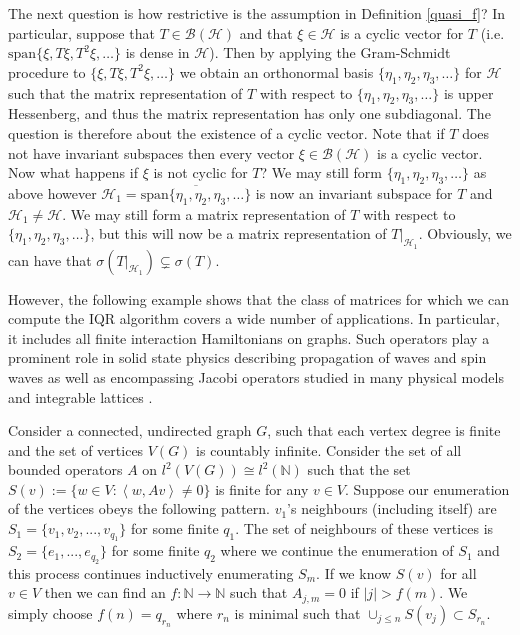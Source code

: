 \documentclass[a4paper,10pt]{article}
\begin{document}
The next question is how restrictive is the assumption in Definition \ref{quasi_f}? In particular, suppose that $T \in \mathcal{B}(\mathcal{H})$ and that $\xi \in \mathcal{H}$ is a cyclic vector for $T$ (i.e. $\mathrm{span}\{\xi, T\xi, T^2\xi, \hdots\}$ is dense in $\mathcal{H}$). Then by applying the Gram-Schmidt procedure to $\{\xi, T\xi, T^2\xi, \hdots\}$ we 
obtain an orthonormal basis $\{\eta_1, \eta_2, \eta_3, \hdots\}$ for $\mathcal{H}$ such that the matrix 
representation of $T$ with respect to $\{\eta_1, \eta_2, \eta_3, \hdots\}$ is upper Hessenberg, and thus the matrix representation has only one subdiagonal. The question is therefore about the existence of a cyclic vector. Note that if $T$ does not have invariant subspaces then every vector $\xi \in \mathcal{B}(\mathcal{H})$ is a cyclic vector. Now what happens if $\xi$ is not cyclic for $T$? We may still form $\{\eta_1, \eta_2, \eta_3, \hdots\}$ as above however $\mathcal{H}_1 = \overline{\mathrm{span}\{\eta_1, \eta_2, \eta_3, \hdots\}}$ is now an invariant subspace for $T$ and $\mathcal{H}_1 \neq \mathcal{H}.$ We may still form a matrix representation of $T$ with respect to $\{\eta_1, \eta_2, \eta_3, \hdots\}$, but this will now be a matrix representation of $T|_{\mathcal{H}_1}.$ Obviously, we can have that $\sigma(T|_{\mathcal{H}_1}) \subsetneq \sigma(T)$.

However, the following example shows that the class of matrices for which we can compute the IQR algorithm covers a wide number of applications. In particular, it includes all finite interaction Hamiltonians on graphs. Such operators play a prominent role in solid state physics \cite{mattis1986few,mogilner1991hamiltonians} describing propagation of waves and spin waves as well as encompassing Jacobi operators studied in many physical models and integrable lattices \cite{teschl2000jacobi}.

\begin{example}
Consider a connected, undirected graph $G$, such that each vertex degree is finite and the set of vertices $V(G)$ is countably infinite. Consider the set of all bounded operators $A$ on $l^2(V(G))\cong l^2(\mathbb{N})$ such that the set $S(v):=\{w\in V:\left\langle w,Av\right\rangle\neq0\}$ is finite for any $v\in V$. Suppose our enumeration of the vertices obeys the following pattern. $v_1$'s neighbours (including itself) are $S_1=\{v_1,v_2,...,v_{q_1}\}$ for some finite $q_1$. The set of neighbours of these vertices is $S_2=\{e_1,...,e_{q_2}\}$ for some finite $q_2$ where we continue the enumeration of $S_1$ and this process continues inductively enumerating $S_m$. If we know $S(v)$ for all $v\in V$ then we can find an $f:\mathbb{N}\rightarrow\mathbb{N}$ such that $A_{j,m}=0$ if $|j|>f(m)$. We simply choose $f(n)=q_{r_n}$ where $r_n$ is minimal such that $\cup_{j\leq n}S(v_j)\subset S_{r_n}$.
\end{example}
\end{document}
